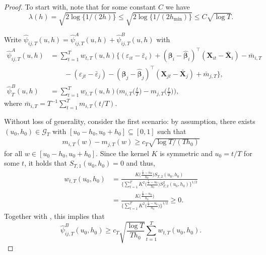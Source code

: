 \documentclass[a4paper,12pt]{article}
\makeatletter
\renewcommand{\eqref}[1]{\tagform@{\ref{#1}}}
\makeatother
\begin{document}
\begin{proof}
To start with, note that for some constant $C$ we have
\begin{equation}\label{eqA:power:lambda}
\lambda(h) = \sqrt{2\log\{1/(2h)\}} \le \sqrt{2\log\{1/(2h_{\min})\}} \le C \sqrt{\log T}.
\end{equation}

Write $\widehat{\psi}_{ij, T}(u,h) = \widehat{\psi}_{ij, T}^A(u,h) + \widehat{\psi}_{ij, T}^B(u,h)$ with 
\begin{align*}
\widehat{\psi}^A_{ij,T}(u,h) &= \sum_{t=1}^T w_{t,T}(u,h) \big\{ (\varepsilon_{it} - \bar{\varepsilon}_i) + (\bm{\beta}_i - \widehat{\bm{\beta}}_i)^\top (\mathbf{X}_{it} - \bar{\mathbf{X}}_{i}) - \bar{m}_{i, T} \\
& \quad \quad - (\varepsilon_{jt} - \bar{\varepsilon}_j) -  (\bm{\beta}_j - \widehat{\bm{\beta}}_j)^\top (\mathbf{X}_{jt} - \bar{\mathbf{X}}_{j}) + \bar{m}_{j, T} \big\},\\
\widehat{\psi}_T^B(u,h) &= \sum\nolimits_{t=1}^T w_{t,T}(u,h) \bigg(m_{i, T}\Big(\frac{t}{T}\Big) - m_{j, T}\Big(\frac{t}{T}\Big) \bigg),
\end{align*}
where $\bar{m}_{i, T} = T^{-1} \sum_{t=1}^T m_{i, T} (t/T)$. 

Without loss of generality, consider the first scenario: by assumption, there exists $(u_0,h_0) \in \mathcal{G}_T$ with $[u_0-h_0,u_0+h_0] \subseteq [0,1]$ such that \begin{align}\label{eqA:power2}
m_{i,T}(w) - m_{j,T}(w) \ge c_T \sqrt{\log T/(Th_0)}
\end{align}
for all $w \in [u_0-h_0,u_0+h_0]$. Since the kernel $K$ is symmetric and $u_0 = t/T$ for some $t$, it holds that $S_{T,1}(u_0,h_0) = 0$ and thus,
\begin{align} w_{t,T}(u_0,h_0) &= \frac{K\Big(\frac{\frac{t}{T}-u_0}{h_0}\Big) S_{T, 2}(u_0, h_0)}{\Big\{ \sum_{t=1}^T K^2\Big(\frac{\frac{t}{T}-u_0}{h_0}\Big)S^2_{T, 2}(u_0, h_0) \Big\}^{1/2}} \\
&=\frac{K\Big(\frac{\frac{t}{T}-u_0}{h_0}\Big)}{\Big\{ \sum_{t=1}^T K^2\Big(\frac{\frac{t}{T}-u_0}{h_0}\Big)\Big\}^{1/2}} \ge 0.
\end{align}
Together with \eqref{eqA:power2}, this implies that 
\begin{equation}\label{eq1-proof-prop-test-power}
\widehat{\psi}_{ij, T}^B(u_0,h_0) \ge c_T \sqrt{\frac{\log T}{Th_0}} \sum\limits_{t=1}^T w_{t,T}(u_0,h_0).
\end{equation}


\end{proof}
\end{document}
